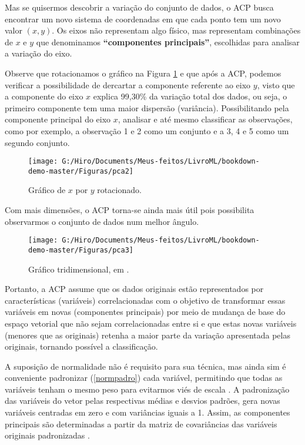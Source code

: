 \documentclass[
  openany]{book}
\begin{document}
Mas se quisermos descobrir a variação do conjunto de dados, o ACP busca encontrar um novo sistema de coordenadas em que cada ponto tem um novo valor \((x, y)\). Os eixos não representam algo físico, mas representam combinações de \(x\) e \(y\) que denominamos \textbf{``componentes principais''}, escolhidas para analisar a variação do eixo.

Observe que rotacionamos o gráfico na Figura \ref{fig:pca2} e que após a ACP, podemos verificar a possibilidade de dercartar a componente referente ao eixo \(y\), visto que a componente do eixo \(x\) explica 99,30\% da variação total dos dados, ou seja, o primeiro componente tem uma maior dispersão (variância). Possibilitando pela componente principal do eixo \(x\), analisar e até mesmo classificar as observações, como por exemplo, a observação 1 e 2 como um conjunto e a 3, 4 e 5 como um segundo conjunto.

\begin{figure}

{\centering \texttt{[image: G:/Hiro/Documents/Meus-feitos/LivroML/bookdown-demo-master/Figuras/pca2]} 

}

\caption{Gráfico de \(x\) por \(y\) rotacionado.}\label{fig:pca2}
\end{figure}



Com mais dimensões, o ACP torna-se ainda mais útil pois possibilita observarmos o conjunto de dados num melhor ângulo.

\begin{figure}

{\centering \texttt{[image: G:/Hiro/Documents/Meus-feitos/LivroML/bookdown-demo-master/Figuras/pca3]} 

}

\caption{Gráfico tridimensional, em \citet{powellpca}.}\label{fig:pca3}
\end{figure}



Portanto, a ACP assume que os dados originais estão representados por características (variáveis) correlacionadas com o objetivo de transformar essas variáveis em novas (componentes principais) por meio de mudança de base do espaço vetorial que não sejam correlacionadas entre si e que estas novas variáveis (menores que as originais) retenha a maior parte da variação apresentada pelas originais, tornando possível a classificação.

A suposição de normalidade não é requisito para sua técnica, mas ainda sim é conveniente padronizar (\ref{normpadro}) cada variável, permitindo que todas as variáveis tenham o mesmo peso para evitarmos viés de escala \citep{hongyu2016analise}. A padronização das variáveis do vetor pelas respectivas médias e desvios padrões, gera novas variáveis centradas em zero e com variâncias iguais a 1. Assim, as componentes principais são determinadas a partir da matriz de covariâncias das variáveis originais padronizadas \citep{mingoti2007analise}.
\end{document}
